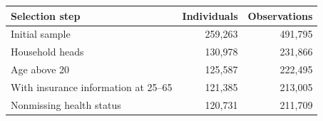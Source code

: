 \begin{tabular}{@{}l r r@{}}
\toprule
Selection step & Individuals & Observations \\
\midrule
Initial sample & 259,263 & 491,795 \\
Household heads & 130,978 & 231,866 \\
Age above 20 & 125,587 & 222,495 \\
With insurance information at 25--65 & 121,385 & 213,005 \\
Nonmissing health status & 120,731 & 211,709 \\
\bottomrule
\end{tabular}
